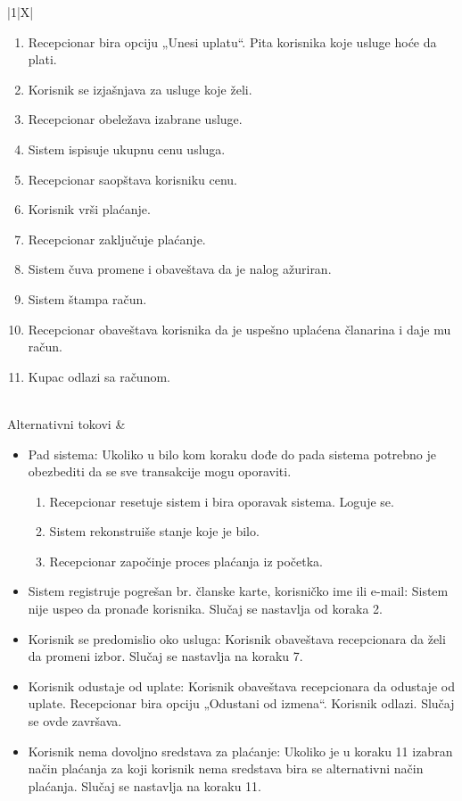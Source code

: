 \documentclass[../main.tex]{subfiles}
\begin{document}
\begin{center}
\begin{tabularx}{\textwidth}{|1|X|}
\begin{enumerate}
        \item Recepcionar bira opciju „Unesi uplatu“. Pita korisnika koje usluge hoće da plati.
        \item Korisnik se izjašnjava za usluge koje želi.
        \item Recepcionar obeležava izabrane usluge.
        \item Sistem ispisuje ukupnu cenu usluga.
        \item Recepcionar saopštava korisniku cenu.
        \item Korisnik vrši plaćanje.
        \item Recepcionar zaključuje plaćanje.
        \item Sistem čuva promene i obaveštava da je nalog ažuriran.
        \item Sistem štampa račun.
        \item Recepcionar obaveštava korisnika da je uspešno uplaćena članarina i daje mu račun.
        \item Kupac odlazi sa računom.
    \end{enumerate}\\
\hline
    Alternativni tokovi & \begin{itemize}
        \item[A1] Pad sistema: Ukoliko u bilo kom koraku dođe do pada sistema potrebno je obezbediti da se sve transakcije mogu oporaviti.\begin{enumerate}
            \item Recepcionar resetuje sistem i bira oporavak sistema. Loguje se.
            \item Sistem rekonstruiše stanje koje je bilo.
            \item Recepcionar započinje proces plaćanja iz početka.
        \end{enumerate}
        \item[A5] Sistem registruje pogrešan br. članske karte, korisničko ime ili e-mail:  Sistem nije uspeo da pronađe korisnika. Slučaj se nastavlja od koraka 2.
        \item[A10.1] Korisnik se predomislio oko usluga: Korisnik obaveštava recepcionara da želi da promeni izbor. Slučaj se nastavlja na koraku 7.
        \item[A10.2] Korisnik odustaje od uplate: Korisnik obaveštava recepcionara da odustaje od uplate. Recepcionar bira opciju „Odustani od izmena“. Korisnik odlazi. Slučaj se ovde završava.
        \item[A11.1] Korisnik nema dovoljno sredstava za plaćanje: Ukoliko je u koraku 11 izabran način plaćanja za koji korisnik nema sredstava bira se alternativni način plaćanja. Slučaj se nastavlja na koraku 11.

\end{itemize}
\end{tabularx}
\end{center}
\end{document}
